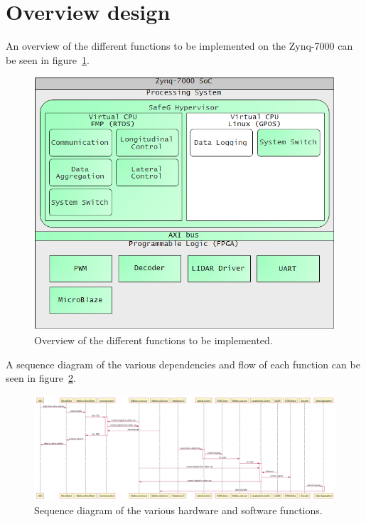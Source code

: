 \section{Overview design}
An overview of the different functions to be implemented on the Zynq-7000 can be seen in figure~\ref{fig:overview}.

\begin{figure}[H]
\centering
\includegraphics[width=\textwidth]{./img/design_overview.png}
\caption{Overview of the different functions to be implemented.}\label{fig:overview}
\end{figure}

A sequence diagram of the various dependencies and flow of each function can be seen in figure~\ref{fig:sequence}.

\begin{figure}[H]
\centering
\includegraphics[width=\textwidth]{./img/design_sequence.png}
\caption{Sequence diagram of the various hardware and software functions.}\label{fig:sequence}
\end{figure}

